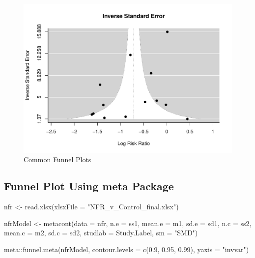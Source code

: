 \documentclass[
  11pt,
]{article}
\newenvironment{Shaded}{\begin{snugshade}}{\end{snugshade}}
\newcommand{\AttributeTok}[1]{\textcolor[rgb]{0.77,0.63,0.00}{#1}}
\newcommand{\FloatTok}[1]{\textcolor[rgb]{0.00,0.00,0.81}{#1}}
\newcommand{\FunctionTok}[1]{\textcolor[rgb]{0.00,0.00,0.00}{#1}}
\newcommand{\NormalTok}[1]{#1}
\newcommand{\OtherTok}[1]{\textcolor[rgb]{0.56,0.35,0.01}{#1}}
\newcommand{\SpecialCharTok}[1]{\textcolor[rgb]{0.00,0.00,0.00}{#1}}
\newcommand{\StringTok}[1]{\textcolor[rgb]{0.31,0.60,0.02}{#1}}
\begin{document}
\begin{figure}

{\centering \includegraphics{IntroToMA_pdf_files/figure-latex/funnel-plot-2} 

}

\caption{Common Funnel Plots}\label{fig:funnel-plot-2}
\end{figure}

\hypertarget{funnel-plot-using-meta-package}{%
\subsection{Funnel Plot Using meta Package}\label{funnel-plot-using-meta-package}}

\begin{Shaded}
\begin{Highlighting}[]
\NormalTok{nfr }\OtherTok{\textless{}{-}} \FunctionTok{read.xlsx}\NormalTok{(}\AttributeTok{xlsxFile =} \StringTok{"NFR\_v\_Control\_final.xlsx"}\NormalTok{)}

\NormalTok{nfrModel }\OtherTok{\textless{}{-}} \FunctionTok{metacont}\NormalTok{(}\AttributeTok{data =}\NormalTok{ nfr, }\AttributeTok{n.e =}\NormalTok{ ss1, }\AttributeTok{mean.e =}\NormalTok{ m1, }\AttributeTok{sd.e =}\NormalTok{ sd1,}
    \AttributeTok{n.c =}\NormalTok{ ss2, }\AttributeTok{mean.c =}\NormalTok{ m2, }\AttributeTok{sd.c =}\NormalTok{ sd2, }\AttributeTok{studlab =}\NormalTok{ Study.Label,}
    \AttributeTok{sm =} \StringTok{"SMD"}\NormalTok{)}

\NormalTok{meta}\SpecialCharTok{::}\FunctionTok{funnel.meta}\NormalTok{(nfrModel, }\AttributeTok{contour.levels =} \FunctionTok{c}\NormalTok{(}\FloatTok{0.9}\NormalTok{, }\FloatTok{0.95}\NormalTok{, }\FloatTok{0.99}\NormalTok{),}
    \AttributeTok{yaxis =} \StringTok{"invvar"}\NormalTok{)}
\end{Highlighting}
\end{Shaded}
\end{document}
